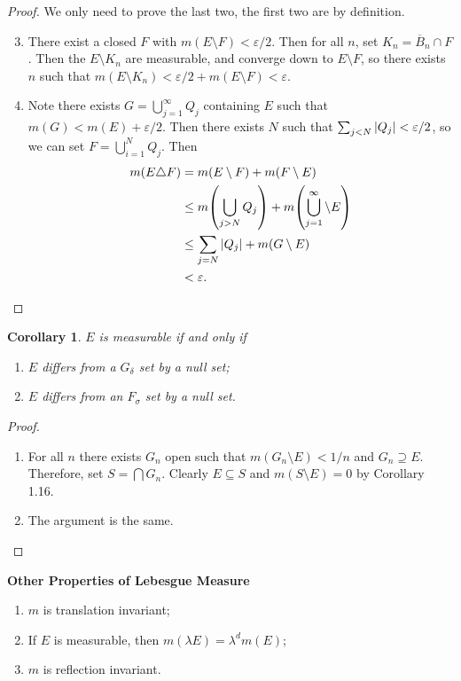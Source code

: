\documentclass[leqno, openany]{memoir}
\newtheorem{cor}[thm]{Corollary}
\theoremstyle{definition}
\theoremstyle{remark}
\theoremstyle{plain}
\theoremstyle{definition}
\theoremstyle{remark}
\newcommand{\ep}{\varepsilon}
\newcommand{\ol}[1]{\overline{#1}}
\begin{document}
\begin{proof} We only need to prove the last two, the first two are by
    definition.  \begin{enumerate} \setcounter{enumi}{2} \item There exist a
        closed $F$ with $m(E \setminus F) < \ep / 2$. Then for all $n$, set
        $K_n = \ol{B}_n \cap F$. Then the $E \setminus K_n$ are measurable, and
        converge down to $E \setminus F$, so there exists $n$ such that $m(E
        \setminus K_n) < \ep/2 + m(E \setminus F) < \ep$.  \item Note there
        exists $G = \bigcup_{j=1}^{\infty} Q_j$ containing $E$ such that $m(G)
        < m(E) + \ep/2$. Then there exists $N$ such that $\sum_{j < N}
        \abs{Q_j} < \ep/2$, so we can set $F = \bigcup_{i=1}^N Q_j$. Then
        \begin{align*} m(E \triangle F) &= m(E \setminus F) + m(F \setminus E)
        \\ &\leq m\qty(\bigcup_{j>N} Q_j) + m\qty(\bigcup_{j=1}^{\infty}
            \setminus E) \\ &\leq \sum_{j=N} \abs{Q_j} + m(G \setminus E) \\ &<
    \ep. \qedhere \end{align*} \end{enumerate} \end{proof}

\begin{cor} $E$ is measurable if and only if \begin{enumerate} \item $E$
differs from a $G_{\delta}$ set by a null set; \item $E$ differs from an
$F_{\sigma}$ set by a null set.  \end{enumerate} \end{cor}

\begin{proof} \begin{enumerate} \item For all $n$ there exists $G_n$ open such
    that $m(G_n \setminus E) < 1/n$ and $G_n \supseteq E$. Therefore, set $S =
    \bigcap G_n$. Clearly $E \subseteq S$ and $m(S \setminus E) = 0$ by
    Corollary 1.16.  \item The argument is the same.  \end{enumerate}
        \end{proof}

\textbf{Other Properties of Lebesgue Measure} \begin{enumerate} \item $m$ is
translation invariant; \item If $E$ is measurable, then $m(\lambda E) =
\lambda^d m(E)$; \item $m$ is reflection invariant.  \end{enumerate}
\end{document}
